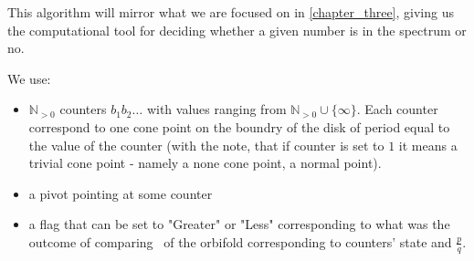 This algorithm will mirror what we are focused on in \ref{chapter_three}, giving us the 
computational tool for deciding whether a given number is in the spectrum or no. 



We use: 
\begin{itemize}
\item $\mathbb{N}_{>0}$ counters $b_1b_2\dots$ 
with values ranging from $\mathbb{N}_{>0}\cup\{\infty\}$.
Each counter correspond to one cone point 
on the boundry of the disk of period equal to the value of the counter (with the note, that 
if counter is set to $1$ it means a trivial cone point - namely a none cone point, a normal point). 
\item a pivot pointing at some counter 
\item a flag that can be set to "Greater" or "Less" corresponding to what was 
the outcome of comparing \Eoc\ of the orbifold corresponding to counters' state and 
$\frac{p}{q}$.  
\end{itemize}


